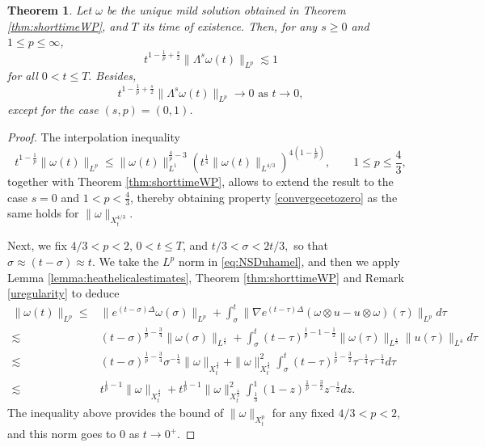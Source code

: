 \documentclass[10pt,a4paper]{amsart}
\newtheorem{thm}{Theorem}
\def\heat#1{e^{#1 \Delta}}
\newcommand{\na}{\nabla}
\newcommand{\norm}[1]{\|#1\|}
\newcommand{\w}{\omega}
\begin{document}
\begin{thm}\label{thm:higherregrate}
Let $\w$ be the unique mild solution obtained in Theorem \ref{thm:shorttimeWP}, and $T$ its time of existence. Then, for any $s\geq 0$ and $1\leq p\leq  \infty$,
\begin{equation}\label{eq:scalingsolutionhigherregularity}
t^{1-\frac{1}{p}+\frac{s}{2}}\|\Lambda^s\w(t)\|_{L^p}\lesssim 1  
\end{equation}
for all $0<t\leq T.$ Besides, 
\begin{equation}\label{convergecetozero}
t^{1-\frac{1}{p}+\frac{s}{2}}\| \Lambda^s\w(t)\|_{L^p}\to 0 \text{ as }t\to 0, 
\end{equation}
except for the case $(s,p)=(0,1)$.
\end{thm}

\begin{proof}
The interpolation inequality
$$
t^{1-\frac{1}{p}}\|\omega(t)\|_{L^p}
\leq
\|\omega(t)\|_{L^1}^{\frac{4}{p}-3}
(t^{\frac14}\|\omega(t)\|_{L^{4/3}})^{4(1-\frac{1}{p})},
\qquad 1\leq p\leq \frac{4}{3},
$$
together with Theorem \ref{thm:shorttimeWP}, allows to extend the result to the case $s=0$ and $1<p<\frac{4}{3}$, thereby obtaining property \eqref{convergecetozero} as the same holds for $\norm{\w}_{X_t^{4/3}}$.

Next, we fix $4/3<p<2$, $0<t\leq T$, and $t/3<\sigma<2t/3,$ so that $\sigma\approx (t-\sigma)\approx t$. We take the $L^p$ norm in \eqref{eq:NSDuhamel}, and then we apply Lemma \ref{lemma:heathelicalestimates}, Theorem \ref{thm:shorttimeWP} and Remark \ref{uregularity} to deduce
\begin{equation}\label{eq:L2regularityestimate}
\begin{aligned}
\|\w(t)\|_{L^p}\leq& \|\heat{(t-\sigma)}\w(\sigma)\|_{L^p}+\int_\sigma^t\|\na\heat{(t-\tau)}(\w\otimes u-u\otimes \w)(\tau)\|_{L^p}d\tau\\
\lesssim & (t-\sigma)^{\frac{1}{p}-\frac{3}{4}}\|\omega(\sigma)\|_{L^{\frac{4}{3}}}+\int_\sigma^t (t-\tau)^{\frac{1}{p}-{1}-\frac{1}{2}}\|\w(\tau)\|_{L^\frac{4}{3}}\|u(\tau)\|_{L^4}d\tau \\
\lesssim & (t-\sigma)^{\frac{1}{p}-\frac{3}{4}}\sigma^{-\frac{1}{4}}\|\omega\|_{X_t^{\frac{4}{3}}}+\|\omega\|^2_{X_t^{\frac{4}{3}}}\int_\sigma^t (t-\tau)^{\frac{1}{p}-\frac{3}{2}}\tau^{-\frac{1}{4}}\tau^{-\frac{1}{4}}d\tau\\
\lesssim & t^{\frac{1}{p}-1}\|\omega\|_{X_t^{\frac{4}{3}}}+ t^{\frac{1}{p}-1}\|\omega\|^2_{X_t^{\frac{4}{3}}}\int_{\frac{1}{3}}^1 (1-z)^{\frac{1}{p}-\frac{3}{2}}z^{-\frac{1}{2}}dz.
\end{aligned}
\end{equation}
The inequality above provides the bound of $\norm{\w}_{X_t^p}$ for any fixed $4/3<p<2$, and this norm goes to 0 as $t\to0^+$.


\end{proof}
\end{document}
